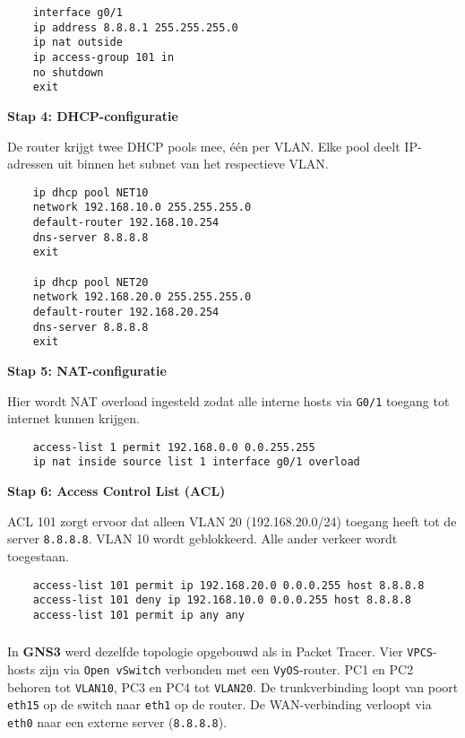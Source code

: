 \begin{verbatim}
    interface g0/1
    ip address 8.8.8.1 255.255.255.0
    ip nat outside
    ip access-group 101 in
    no shutdown
    exit
\end{verbatim}

\textbf{Stap 4: DHCP-configuratie}

De router krijgt twee DHCP pools mee, één per VLAN. Elke pool deelt IP-adressen uit binnen het subnet van het respectieve VLAN.

\begin{verbatim}
    ip dhcp pool NET10
    network 192.168.10.0 255.255.255.0
    default-router 192.168.10.254
    dns-server 8.8.8.8
    exit
    
    ip dhcp pool NET20
    network 192.168.20.0 255.255.255.0
    default-router 192.168.20.254
    dns-server 8.8.8.8
    exit
\end{verbatim}

\textbf{Stap 5: NAT-configuratie}

Hier wordt NAT overload ingesteld zodat alle interne hosts via \texttt{G0/1} toegang tot internet kunnen krijgen.

\begin{verbatim}
    access-list 1 permit 192.168.0.0 0.0.255.255
    ip nat inside source list 1 interface g0/1 overload
\end{verbatim}

\textbf{Stap 6: Access Control List (ACL)}

ACL 101 zorgt ervoor dat alleen VLAN 20 (192.168.20.0/24) toegang heeft tot de server \texttt{8.8.8.8}. VLAN 10 wordt geblokkeerd. Alle ander verkeer wordt toegestaan.

\begin{verbatim}
    access-list 101 permit ip 192.168.20.0 0.0.0.255 host 8.8.8.8
    access-list 101 deny ip 192.168.10.0 0.0.0.255 host 8.8.8.8
    access-list 101 permit ip any any
\end{verbatim}


\subsubsection{}

In \textbf{GNS3} werd dezelfde topologie opgebouwd als in Packet Tracer. Vier \texttt{VPCS}-hosts zijn via \texttt{Open vSwitch} verbonden met een \texttt{VyOS}-router. PC1 en PC2 behoren tot \texttt{VLAN10}, PC3 en PC4 tot \texttt{VLAN20}. De trunkverbinding loopt van poort \texttt{eth15} op de switch naar \texttt{eth1} op de router. De WAN-verbinding verloopt via \texttt{eth0} naar een externe server (\texttt{8.8.8.8}). 

